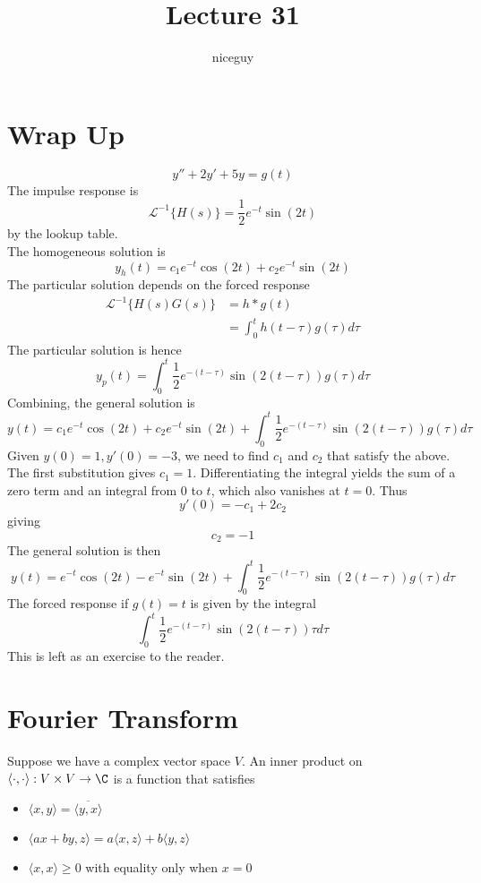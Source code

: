 \documentclass[12pt]{article}
\author{niceguy}
\title{Lecture 31}
\begin{document}
\maketitle

\section{Wrap Up}
\begin{ex}
	$$y'' + 2y' + 5y = g(t)$$
	The impulse response is
	$$\mathcal{L}^{-1}\{H(s)\} = \frac{1}{2}e^{-t}\sin(2t)$$
	by the lookup table. \\
	The homogeneous solution is
	$$y_h(t) = c_1e^{-t}\cos(2t) + c_2e^{-t}\sin(2t)$$
	The particular solution depends on the forced response
	\begin{align*}
		\mathcal{L}^{-1}\{H(s)G(s)\} &= h*g(t) \\
					     &= \int_0^th(t-\tau)g(\tau)d\tau
	\end{align*}
	The particular solution is hence
	$$y_p(t) = \int_0^t\frac{1}{2}e^{-(t-\tau)}\sin(2(t-\tau))g(\tau)d\tau$$
	Combining, the general solution is
	$$y(t) = c_1e^{-t}\cos(2t) + c_2e^{-t}\sin(2t) + \int_0^t\frac{1}{2}e^{-(t-\tau)}\sin(2(t-\tau))g(\tau)d\tau$$
	Given $y(0)=1,y'(0)=-3$, we need to find $c_1$ and $c_2$ that satisfy the above. \\
	The first substitution gives $c_1 = 1$. Differentiating the integral yields the sum of a zero term and an integral from $0$ to $t$, which also vanishes at $t=0$. Thus
	$$y'(0) = -c_1 + 2c_2$$
	giving
	$$c_2 = -1$$
	The general solution is then
	$$y(t) = e^{-t}\cos(2t) - e^{-t}\sin(2t) + \int_0^t\frac{1}{2}e^{-(t-\tau)}\sin(2(t-\tau))g(\tau)d\tau$$
	The forced response if $g(t) = t$ is given by the integral
	$$\int_0^t\frac{1}{2}e^{-(t-\tau)}\sin(2(t-\tau))\tau d\tau$$
	This is left as an exercise to the reader.
\end{ex}

\section{Fourier Transform}

Suppose we have a complex vector space $V$. An inner product on $\langle\cdot,\cdot\rangle:V \times V \rightarrow \C$ is a function that satisfies
\begin{itemize}
	\item $\langle x,y\rangle = \overline{\langle y, x\rangle}$
	\item $\langle ax+by,z\rangle = a\langle x,z\rangle + b\langle y, z\rangle$
	\item $\langle x,x\rangle \geq 0$ with equality only when $x=0$
\end{itemize}
\end{document}

